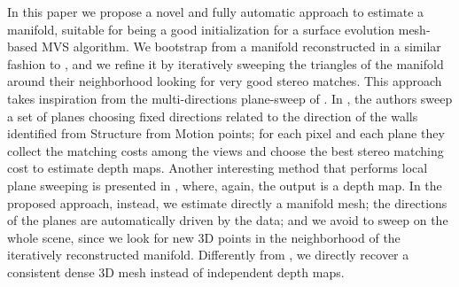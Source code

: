 In this paper we propose a novel and fully automatic approach to estimate a manifold, suitable for being a good initialization for a surface evolution mesh-based MVS algorithm.
We bootstrap from a manifold reconstructed in a similar fashion to \cite{Litvinov_Lhuillier_13}, and we refine it by iteratively sweeping the triangles of the manifold around their neighborhood looking for very good stereo matches.
This approach takes inspiration from the multi-directions plane-sweep of \cite{gallup2007real}.
In \cite{gallup2007real}, the authors sweep a set of planes choosing fixed directions related to the direction of the walls identified from Structure from Motion points; for each pixel and each plane they collect the matching costs among the views and choose the best stereo matching cost to estimate depth maps.
Another interesting method that performs local plane sweeping is presented in \cite{sinha2014efficient}, where, again, the output is a depth map.
In the proposed approach, instead, we estimate directly a manifold mesh; the directions of the planes are automatically driven by the data; and we avoid to sweep on the whole scene, since we look for new 3D points in the neighborhood of the iteratively reconstructed manifold. 
Differently from \cite{gallup2007real}, we directly recover a consistent dense 3D mesh instead of independent depth maps.



